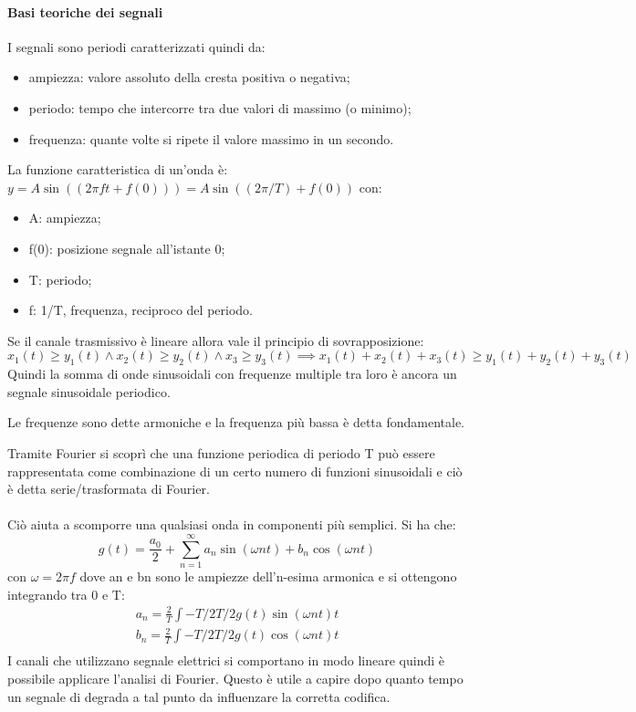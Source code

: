 \documentclass{subfiles}
\begin{document}
    \paragraph*{Basi teoriche dei segnali}
    I segnali sono periodi caratterizzati quindi da:\begin{itemize}
        \item ampiezza: valore assoluto della cresta positiva o negativa;
        \item periodo: tempo che intercorre tra due valori di massimo (o minimo);
        \item frequenza: quante volte si ripete il valore massimo in un secondo.
    \end{itemize}
    La funzione caratteristica di un'onda è: 
        \(y = A \sin((2 \pi f t + f(0))) = A \sin((2 \pi / T) + f(0))\) 
    con:
    \begin{itemize}
        \item A: ampiezza;
        \item f(0): posizione segnale all'istante 0;
        \item T: periodo;
        \item f: 1/T, frequenza, reciproco del periodo.
    \end{itemize}
    Se il canale trasmissivo è lineare allora vale il principio di sovrapposizione:\\
    \(x_{1}(t) \ge y_{1}(t) \land x_{2}(t) \ge y_{2}(t) \land x_{3} \ge y_{3}(t) \implies x_{1}(t) + x_{2}(t) + x_{3}(t) \ge y_{1}(t) + y_{2}(t) + y_{3}(t)\)
    Quindi la somma di onde sinusoidali con frequenze multiple tra loro è ancora un segnale sinusoidale periodico.
    \begin{Note*}
        Le frequenze sono dette armoniche e la frequenza più bassa è detta fondamentale.
    \end{Note*}
    \noindent Tramite Fourier si scoprì che una funzione periodica di periodo T può essere rappresentata come combinazione di un certo 
    numero di funzioni sinusoidali e ciò è detta serie/trasformata di Fourier.\\ \\
    Ciò aiuta a scomporre una qualsiasi onda in componenti più semplici. Si ha che:
    \[
        g(t) = \frac{a_{0}}{2} + \sum\limits_{n = 1}^{\infty}{a_{n} \sin(\omega nt) + b_{n} \cos(\omega nt)}
    \]
    con \(\omega = 2 \pi f\)
    dove an e bn sono le ampiezze dell'n-esima armonica e si ottengono integrando tra 0 e T:
    \[
        \begin{gathered}
            a_{n} = \frac{2}{T} \int{-T/2}{T/2}{g(t) \sin(\omega nt)}{t} \\
            b_{n} = \frac{2}{T} \int{-T/2}{T/2}{g(t) \cos(\omega nt)}{t} \\
        \end{gathered}
    \]
    I canali che utilizzano segnale elettrici si comportano in modo lineare quindi è possibile applicare l'analisi di Fourier. Questo è 
    utile a capire dopo quanto tempo un segnale di degrada a tal punto da influenzare la corretta codifica.
\end{document}
